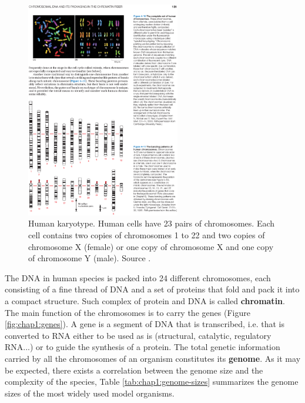 \begin{figure}[h]
	\begin{minipage}[b]{\linewidth}
	  \centering
	  \includegraphics*[width=0.6\textwidth]{figures/chap1_chromosomes_full}
	  \caption{Human karyotype. Human cells have 23 pairs of
       chromosomes. Each cell contains two copies of chromosomes 1 to
       22 and two copies of chromosome X (female) or one copy of
       chromosome X and one copy of chromosome Y (male). Source \cite{alberts}.}
	  \label{fig:chap1:chromosomes}
   \end{minipage}
\end{figure}

The DNA in human species is packed into 24 different chromosomes, each
consisting of a fine thread of DNA and a set of proteins that fold and
pack it into a compact structure. Such complex of protein and DNA is
called {\bf chromatin}. The main function of the chromosomes is to carry
the genes (Figure \ref{fig:chap1:genes}). A gene is a segment of DNA that is transcribed, i.e. that
is converted to RNA either to be used as is (structural, catalytic,
regulatory RNA...) or to guide the synthesis of a protein. The 
total genetic information carried by all the chromosomes of an
organism constitutes its {\bf genome}. As it may be expected, there
exists a correlation between the genome size and the complexity of the
species, Table \ref{tab:chap1:genome-sizes} summarizes the genome sizes of the most widely used
model organisms.

